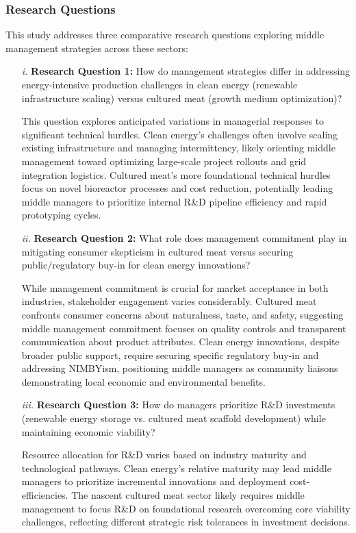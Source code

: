 	\subsubsection{Research Questions}
	This study addresses three comparative research questions exploring middle management strategies across these sectors:
	\begin{enumerate}
		\item[\textit{i.}] \textbf{Research Question 1:} How do management strategies differ in addressing energy-intensive production challenges in clean energy (renewable infrastructure scaling) versus cultured meat (growth medium optimization)?
		
		This question explores anticipated variations in managerial responses to significant technical hurdles. Clean energy’s challenges often involve scaling existing infrastructure and managing intermittency, likely orienting middle management toward optimizing large-scale project rollouts and grid integration logistics. Cultured meat’s more foundational technical hurdles focus on novel bioreactor processes and cost reduction, potentially leading middle managers to prioritize internal R\&D pipeline efficiency and rapid prototyping cycles.\\
		
		\item[\textit{ii.}] \textbf{Research Question 2:} What role does management commitment play in mitigating consumer skepticism in cultured meat versus securing public/regulatory buy-in for clean energy innovations?
		
		While management commitment is crucial for market acceptance in both industries, stakeholder engagement varies considerably. Cultured meat confronts consumer concerns about naturalness, taste, and safety, suggesting middle management commitment focuses on quality controls and transparent communication about product attributes. Clean energy innovations, despite broader public support, require securing specific regulatory buy-in and addressing NIMBYism, positioning middle managers as community liaisons demonstrating local economic and environmental benefits. \\
		
		\item[\textit{iii.}] \textbf{Research Question 3:} How do managers prioritize R\&D investments (renewable energy storage vs. cultured meat scaffold development) while maintaining economic viability?
		
		Resource allocation for R\&D varies based on industry maturity and technological pathways. Clean energy’s relative maturity may lead middle managers to prioritize incremental innovations and deployment cost-efficiencies. The nascent cultured meat sector likely requires middle management to focus R\&D on foundational research overcoming core viability challenges, reflecting different strategic risk tolerances in investment decisions. \\
	\end{enumerate}
	
